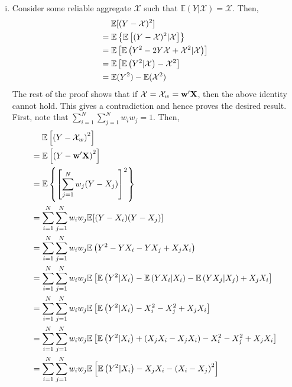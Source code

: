 \documentclass[11pt]{article}
\newcommand{\E}{\mathbb{E}}
\theoremstyle{definition}
\theoremstyle{definition}
\def\w{{\bf w}}
\def\X{{\bf X}}
\def\E{{\mathbb E}}
\begin{document}
\begin{enumerate}[i)]
\item Consider some reliable aggregate $\mathcal{X}$ such that $\E(Y | \mathcal{X}) = \mathcal{X}$. Then,
\begin{align*}
&\hspace{1.3em} \E[(Y-\mathcal{X})^2]\\
 &= \E\left\{\E\left[(Y-\mathcal{X})^2|\mathcal{X}\right]\right\}\\
&= \E\left[\E\left(Y^2-2Y\mathcal{X}+\mathcal{X}^2|\mathcal{X} \right)\right]\\
&= \E\left[\E\left(Y^2|\mathcal{X}\right)-\mathcal{X}^2\right]\\
&= \E(Y^2)-\E(\mathcal{X}^2)
\end{align*}
The rest of the proof shows that if $\mathcal{X} = \mathcal{X}_w = \w'\X$, then the above identity cannot hold. This gives a contradiction and hence proves the desired result. First, note that $\sum_{i=1}^N\sum_{j=1}^Nw_iw_j = 1$. Then,
\begin{align*}
&\hspace{1.3em}  \E\left[\left(Y-\mathcal{X}_w\right)^2\right]\\
 &= \E\left[\left(Y-\w'\X\right)^2\right] \\
 &= \E\left\{\left[\sum_{j=1}^Nw_j (Y-X_j)\right]^2\right\} \\
&= \sum_{i=1}^N\sum_{j=1}^Nw_iw_j \E[(Y-X_i)(Y-X_j)] \\
&= \sum_{i=1}^N\sum_{j=1}^Nw_iw_j \E\left(Y^2-YX_i-YX_j+X_jX_i\right) \\
&= \sum_{i=1}^N\sum_{j=1}^Nw_iw_j \E\left[ \E\left( Y^2|X_i \right)-\E\left( YX_i|X_i \right)-\E\left( YX_j|X_j\right)+X_jX_i \right] \\
&= \sum_{i=1}^N\sum_{j=1}^Nw_iw_j \E\left[ \E\left( Y^2|X_i \right)-X_i^2-X_j^2+X_jX_i \right] \\
&= \sum_{i=1}^N\sum_{j=1}^Nw_iw_j \E\left[\E\left(Y^2|X_i\right) +\left(X_jX_i-X_jX_i\right)-X_i^2-X_j^2+X_jX_i\right] \\
&= \sum_{i=1}^N\sum_{j=1}^Nw_iw_j \E\left[\E\left(Y^2|X_i\right) -X_jX_i-\left(X_i-X_j\right)^2\right] \\

\end{align*}
\end{enumerate}
\end{document}
